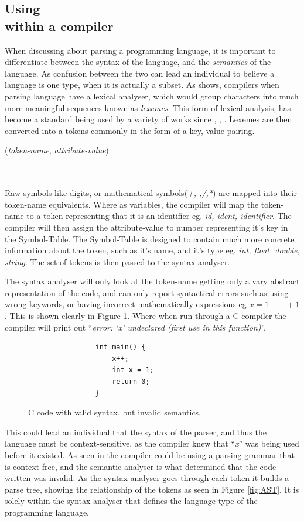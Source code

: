 \subsection{Using \hierarchy{} \\within a compiler}
When discussing about parsing a programming language, it is important to differentiate between the syntax of the language, and the \emph{semantics} of the language. As confusion between the two can lead an individual to believe a language is one type, when it is actually a subset. As \citep{DragonBook} shows, compilers when parsing language have a lexical analyser, which would group characters into much more meaningful sequences known as \emph{lexemes}. This form of lexical analysis, has become a standard being used by a variety of works since \citep{CompilerTutorial}, \citep{CompilerBasics}, \citep{CompilerConstruction}. Lexemes are then converted into a tokens commonly in the form of a key, value pairing. \\ \centerline{(\emph{token-name}, \emph{attribute-value})} \\\\
Raw symbols like digits, or mathematical symbols(\emph{+,-,/,*}) are mapped into their token-name equivalents. Where as variables, the compiler will map the token-name to a token representing that it is an identifier eg. \emph{id, ident, identifier}. The compiler will then assign the attribute-value to number representing it's key in the Symbol-Table. The Symbol-Table is designed to contain much more concrete information about the token, such as it's name, and it's type eg. \emph{int, float, double, string}. The set of tokens is then passed to the syntax analyser.

\newpage
The syntax analyser will only look at the token-name getting only a vary abstract representation of the code, and can only report syntactical errors such as using wrong keywords, or having incorrect mathematically expressions eg $x = 1 + - + 1$. This is shown clearly in Figure \ref{fig:InvalidC}. Where when run through a C compiler the compiler will print out ``\emph{error: \lq{}x\rq{} undeclared (first use in this function)}''. 
\begin{figure}[ht!]
    \centering
    \begin{verbatim}
                int main() {
                    x++;
                    int x = 1;
                    return 0;
                }
    \end{verbatim}
    \caption{C code with valid syntax, but invalid semantics.}
    \label{fig:InvalidC}
\end{figure}
This could lead an individual that the syntax of the parser, and thus the language must be context-sensitive, as the compiler knew that ``\emph{x}'' was being used before it existed. As seen in \citep{DragonBook} the compiler could be using a parsing grammar that is context-free, and the semantic analyser is what determined that the code written was invalid. As the syntax analyser goes through each token it builds a parse tree, showing the relationship of the tokens as seen in Figure \ref{fig:AST}. It is solely within the syntax analyser that defines the language type of the programming language.

